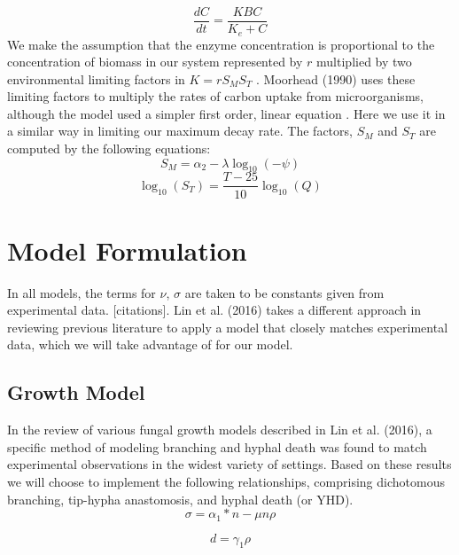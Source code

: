 \documentclass[12pt]{article}
\begin{document}
\begin{multicols}{2}
\begin{equation} \label{eq}
\frac{dC}{dt} = \frac{KBC}{K_{e}+C}
\end{equation}
We make the assumption that the enzyme concentration is proportional to the concentration of biomass in our system represented by $r$ multiplied by two environmental limiting factors in $K=rS_{M}S_{T}$ \cite{Schimel2003}. Moorhead (1990) uses these limiting factors to multiply the rates of carbon uptake from microorganisms, although the model used a simpler first order, linear equation \cite{Moorhead2006}. Here we use it in a similar way in limiting our maximum decay rate. The factors, $S_{M}$ and $S_{T}$ are computed by the following equations:
\begin{equation} \label{eq}
S_{M}=\alpha_{2} - \lambda \log_{10}(-\psi)
\end{equation}
\begin{equation}
\log_{10}(S_T) = \frac{T-25}{10}\log_{10}(Q)
\end{equation}

\section{Model Formulation}

In all models, the terms for $\nu$, $\sigma$ are taken to be constants given from experimental data. [citations]. Lin et al. (2016) takes a different approach in reviewing previous literature to apply a model that closely matches experimental data, which we will take advantage of for our model.  

\subsection{Growth Model}
In the review of various fungal growth models described in Lin et al. (2016), a specific method of modeling branching and hyphal death was found to match experimental observations in the widest variety of settings. Based on these results we will choose to implement the following relationships, comprising dichotomous branching, tip-hypha anastomosis, and hyphal death (or YHD). 
\begin{equation} \label {eq}
\sigma = \alpha_{1}*n - \mu n \rho
\end{equation}

\begin{equation} \label {eq}
d = \gamma_{1}\rho
\end{equation}

\columnbreak

\end{multicols}
\end{document}
